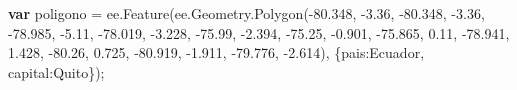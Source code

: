 \documentclass[
  12pt,
  letterpaper,
  twoside]{book}
\newenvironment{Shaded}{\begin{snugshade}}{\end{snugshade}}
\newcommand{\AttributeTok}[1]{\textcolor[rgb]{0.48,0.12,0.64}{#1}}
\newcommand{\DataTypeTok}[1]{\textcolor[rgb]{0.00,0.00,0.00}{#1}}
\newcommand{\FloatTok}[1]{\textcolor[rgb]{0.28,0.53,0.93}{#1}}
\newcommand{\FunctionTok}[1]{\textcolor[rgb]{0.48,0.12,0.64}{#1}}
\newcommand{\KeywordTok}[1]{\textcolor[rgb]{0.00,0.00,0.00}{\textbf{#1}}}
\newcommand{\NormalTok}[1]{#1}
\newcommand{\OperatorTok}[1]{\textcolor[rgb]{0.00,0.00,0.00}{#1}}
\newcommand{\StringTok}[1]{\textcolor[rgb]{0.87,0.29,0.22}{#1}}
\begin{document}
\begin{Shaded}
\begin{Highlighting}[]
\KeywordTok{var}\NormalTok{ poligono }\OperatorTok{=}\NormalTok{ ee}\OperatorTok{.}\FunctionTok{Feature}\NormalTok{(ee}\OperatorTok{.}\AttributeTok{Geometry}\OperatorTok{.}\FunctionTok{Polygon}\NormalTok{(}\OperatorTok{{-}}\FloatTok{80.348}\OperatorTok{,} \OperatorTok{{-}}\FloatTok{3.36}\OperatorTok{,} \OperatorTok{{-}}\FloatTok{80.348}\OperatorTok{,} \OperatorTok{{-}}\FloatTok{3.36}\OperatorTok{,}
                  \OperatorTok{{-}}\FloatTok{78.985}\OperatorTok{,} \OperatorTok{{-}}\FloatTok{5.11}\OperatorTok{,} \OperatorTok{{-}}\FloatTok{78.019}\OperatorTok{,} \OperatorTok{{-}}\FloatTok{3.228}\OperatorTok{,}
                                \OperatorTok{{-}}\FloatTok{75.99}\OperatorTok{,} \OperatorTok{{-}}\FloatTok{2.394}\OperatorTok{,} \OperatorTok{{-}}\FloatTok{75.25}\OperatorTok{,} \OperatorTok{{-}}\FloatTok{0.901}\OperatorTok{,}
                              \OperatorTok{{-}}\FloatTok{75.865}\OperatorTok{,} \FloatTok{0.11}\OperatorTok{,} \OperatorTok{{-}}\FloatTok{78.941}\OperatorTok{,} \FloatTok{1.428}\OperatorTok{,}
                              \OperatorTok{{-}}\FloatTok{80.26}\OperatorTok{,} \FloatTok{0.725}\OperatorTok{,} \OperatorTok{{-}}\FloatTok{80.919}\OperatorTok{,} \OperatorTok{{-}}\FloatTok{1.911}\OperatorTok{,}
                              \OperatorTok{{-}}\FloatTok{79.776}\OperatorTok{,} \OperatorTok{{-}}\FloatTok{2.614}\NormalTok{)}\OperatorTok{,}
\NormalTok{              \{}\DataTypeTok{pais}\OperatorTok{:}\StringTok{\textquotesingle{}Ecuador\textquotesingle{}}\OperatorTok{,} 
              \DataTypeTok{capital}\OperatorTok{:}\StringTok{\textquotesingle{}Quito\textquotesingle{}}\NormalTok{\})}\OperatorTok{;}


\end{Highlighting}
\end{Shaded}
\end{document}
